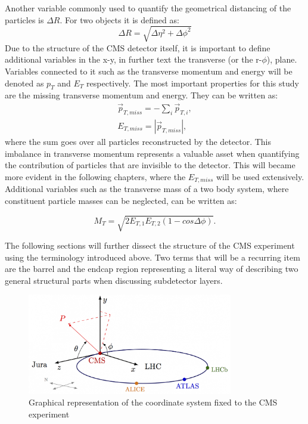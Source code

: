 Another variable commonly used to quantify the geometrical distancing of the particles is $\Delta R$. For two objects it is defined as:
\begin{equation}
\Delta R = \sqrt{\Delta\eta^2+\Delta\phi^2}
\end{equation}
Due to the structure of the CMS detector itself, it is important to define additional variables in the x-y, in further text the transverse (or the r-$\phi$), plane. Variables connected to it such as the transverse momentum and energy will be denoted as $p_T$ and $E_T$ respectively. The most important properties for this study are the missing transverse momentum and energy. They can be written as:
\begin{equation}
\begin{array}{l}
\vec{p}_{T, miss} = -\sum_i\vec{p}_{T,i},\\
E_{T, miss} = |\vec{p}_{T, miss} |,
\end{array}
\label{for:met}
\end{equation}
where the sum goes over all particles reconstructed by the detector. This imbalance in transverse momentum represents a valuable asset when quantifying the contribution of particles that are invisible to the detector. This will became more evident in the following chapters, where the $E_{T,miss}$ will be used extensively. 
Additional variables such as the transverse mass of a two body system, where constituent particle masses can be neglected, can be written as:

\begin{equation}
    M_T = \sqrt{2E_{T,1}E_{T,2}(1-cos\Delta\phi)}.
\end{equation}

The following sections will further dissect the structure of the CMS experiment using the terminology introduced above. Two terms that will be a recurring item are the barrel and the endcap region representing a literal way of describing two general structural parts when discussing subdetector layers.
 
\begin{figure}[htbp]
  \centering
    \includegraphics[width=0.8\textwidth]{CMS_experiment/cms_coordinate_system.png}
  \caption[Graphical representation of the coordinate system fixed to the CMS experiment.]{Graphical representation of the coordinate system fixed to the CMS experiment~\cite{coord_syst}}
  \label{fig:cms_coord_syst}
\end{figure}




